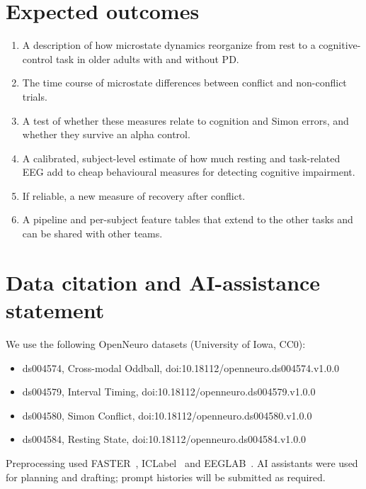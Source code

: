 \documentclass[11pt,a4paper]{article}
\begin{document}
\section{Expected outcomes}

\begin{enumerate}
  \item A description of how microstate dynamics reorganize from rest to a cognitive-control task in older adults with and without PD.
  \item The time course of microstate differences between conflict and non-conflict trials.
  \item A test of whether these measures relate to cognition and Simon errors, and whether they survive an alpha control.
  \item A calibrated, subject-level estimate of how much resting and task-related EEG add to cheap behavioural measures for detecting cognitive impairment.
  \item If reliable, a new measure of recovery after conflict.
  \item A pipeline and per-subject feature tables that extend to the other tasks and can be shared with other teams.
\end{enumerate}

\section*{Data citation and AI-assistance statement}

\noindent We use the following OpenNeuro datasets (University of Iowa, CC0):
\begin{itemize}
  \item ds004574, Cross-modal Oddball, doi:10.18112/openneuro.ds004574.v1.0.0
  \item ds004579, Interval Timing, doi:10.18112/openneuro.ds004579.v1.0.0
  \item ds004580, Simon Conflict, doi:10.18112/openneuro.ds004580.v1.0.0
  \item ds004584, Resting State, doi:10.18112/openneuro.ds004584.v1.0.0
\end{itemize}
\noindent Preprocessing used FASTER~\cite{nolan2010}, ICLabel~\cite{piontonachini2019} and EEGLAB~\cite{delorme2004}. AI assistants were used for planning and drafting; prompt histories will be submitted as required.
\end{document}
